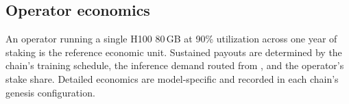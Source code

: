 \subsection{Operator economics}

An operator running a single H100 80\,GB at 90\% utilization across one year of staking is the reference economic unit. Sustained payouts are determined by the chain's training schedule, the inference demand routed from \Hanzo{}, and the operator's stake share. Detailed economics are model-specific and recorded in each chain's genesis configuration.
